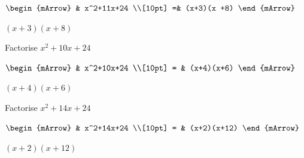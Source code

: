 \begin{mtask}[resume]
\begin{exercise}
\begin{envSolution}
			      $\begin{mArrow}
			          & x^2+11x+24                      \\[10pt]    
					 =& (x+3)(x +8)
				 \end{mArrow}$
                 \begin{shortsolution}  
				       $(x+3)(x +8)$
			     \end{shortsolution}				 
               \end{envSolution}
         \end{exercise}

   \task \begin{exercise} Factorise $x^2+10x+24$\\
             \begin{envSolution}
			      
			      $\begin{mArrow}
			         &  x^2+10x+24                        \\[10pt]    
					 = & (x+4)(x+6)
				 \end{mArrow}$
                 \begin{shortsolution}  
				       $(x+4)(x+6)$
			     \end{shortsolution}				 
               \end{envSolution}
         \end{exercise}

   \task \begin{exercise} Factorise $x^2+14x+24$\\
             \begin{envSolution}
			      $\begin{mArrow}
			         & x^2+14x+24                       \\[10pt]    
					= & (x+2)(x+12) 
				 \end{mArrow}$
                 \begin{shortsolution}  
				       $(x+2)(x+12)$
			     \end{shortsolution}				 
               \end{envSolution}
         \end{exercise}
\end{mtask}

